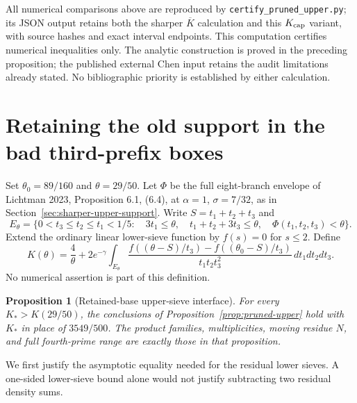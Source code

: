 \documentclass[11pt]{article}
\newtheorem{proposition}[theorem]{Proposition}
\begin{document}
All numerical comparisons above are reproduced by
\texttt{certify\_pruned\_upper.py}; its JSON output
retains both the sharper $\overline K$ calculation and this
$K_{\rm cap}$ variant, with source hashes and exact interval endpoints.
This computation certifies numerical inequalities only. The analytic
construction is proved in the preceding proposition; the published
external Chen input retains the audit limitations already stated.
No bibliographic priority is established by either calculation.

\section{Retaining the old support in the bad third-prefix boxes}
\label{sec:retained-base-upper}

Set $\theta_0=89/160$ and $\theta=29/50$. Let $\Phi$ be the full
eight-branch envelope of Lichtman 2023, Proposition 6.1, (6.4), at
$\alpha=1$, $\sigma=7/32$, as in Section~\ref{sec:sharper-upper-support}.
Write $S=t_1+t_2+t_3$ and
\[
 E_\theta=\{0<t_3\le t_2\le t_1<1/5:\quad
 3t_1\le\theta,\quad t_1+t_2+3t_3\le\theta,\quad
 \Phi(t_1,t_2,t_3)<\theta\}.
\]
Extend the ordinary linear lower-sieve function by $f(s)=0$ for
$s\le2$. Define
\begin{equation}\label{eq:retained-base-functional}
 K(\theta)=\frac4\theta+2e^{-\gamma}
 \int_{E_\theta}
 \frac{f((\theta-S)/t_3)-f((\theta_0-S)/t_3)}
 {t_1t_2t_3^2}\,dt_1dt_2dt_3.
\end{equation}
No numerical assertion is part of this definition.

\begin{proposition}[Retained-base upper-sieve interface]
\label{prop:retained-base-upper}
For every $K_*>K(29/50)$, the conclusions of
Proposition~\ref{prop:pruned-upper} hold with $K_*$ in place of
$3549/500$. The product families, multiplicities, moving residue $N$,
and full fourth-prime range are exactly those in that proposition.
\end{proposition}

We first justify the asymptotic equality needed for the residual lower
sieves. A one-sided lower-sieve bound alone would not justify subtracting
two residual density sums.
\end{document}
